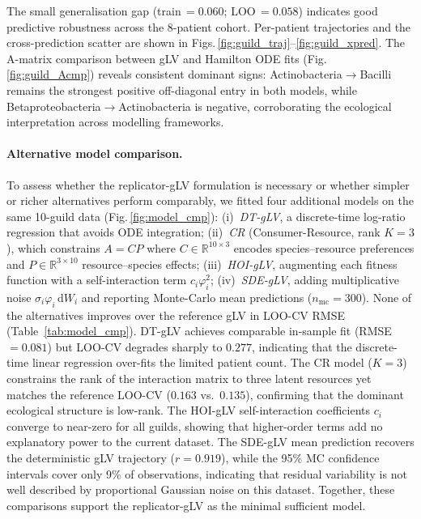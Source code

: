\documentclass[11pt,a4paper]{article}
\begin{document}
The small generalisation gap (train\,$=0.060$; LOO\,$=0.058$) indicates good predictive robustness across the 8-patient cohort.
Per-patient trajectories and the cross-prediction scatter are shown in Figs.\,\ref{fig:guild_traj}--\ref{fig:guild_xpred}.
The A-matrix comparison between gLV and Hamilton ODE fits (Fig.\,\ref{fig:guild_Acmp}) reveals consistent dominant signs: Actinobacteria$\to$Bacilli remains the strongest positive off-diagonal entry in both models, while Betaproteobacteria$\to$Actinobacteria is negative, corroborating the ecological interpretation across modelling frameworks.

\paragraph{Alternative model comparison.}
To assess whether the replicator-gLV formulation is necessary or whether simpler or richer alternatives perform comparably, we fitted four additional models on the same 10-guild data (Fig.\,\ref{fig:model_cmp}): (i)~\emph{DT-gLV}, a discrete-time log-ratio regression that avoids ODE integration; (ii)~\emph{CR} (Consumer-Resource, rank $K=3$), which constrains $A = CP$ where $C\in\mathbb{R}^{10\times3}$ encodes species--resource preferences and $P\in\mathbb{R}^{3\times10}$ resource--species effects; (iii)~\emph{HOI-gLV}, augmenting each fitness function with a self-interaction term $c_i\varphi_i^2$; (iv)~\emph{SDE-gLV}, adding multiplicative noise $\sigma_i\varphi_i\,\mathrm{d}W_i$ and reporting Monte-Carlo mean predictions ($n_{\mathrm{mc}}=300$).
None of the alternatives improves over the reference gLV in LOO-CV RMSE (Table~\ref{tab:model_cmp}).
DT-gLV achieves comparable in-sample fit (RMSE\,$=0.081$) but LOO-CV degrades sharply to $0.277$, indicating that the discrete-time linear regression over-fits the limited patient count.
The CR model ($K=3$) constrains the rank of the interaction matrix to three latent resources yet matches the reference LOO-CV ($0.163$ vs.\ $0.135$), confirming that the dominant ecological structure is low-rank.
The HOI-gLV self-interaction coefficients $c_i$ converge to near-zero for all guilds, showing that higher-order terms add no explanatory power to the current dataset.
The SDE-gLV mean prediction recovers the deterministic gLV trajectory ($r=0.919$), while the 95\% MC confidence intervals cover only 9\% of observations, indicating that residual variability is not well described by proportional Gaussian noise on this dataset.
Together, these comparisons support the replicator-gLV as the minimal sufficient model.
\end{document}
